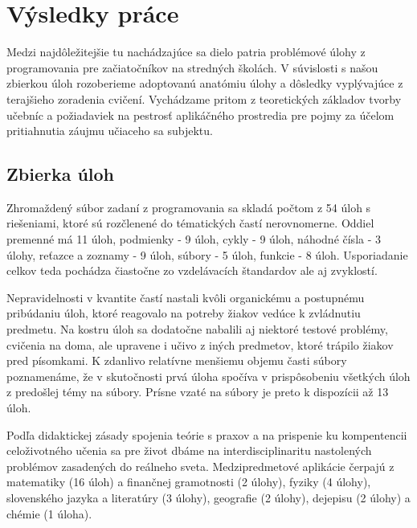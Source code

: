 \chapter{Výsledky práce}
Medzi najdôležitejšie tu nachádzajúce sa dielo patria problémové úlohy z programovania pre začiatočníkov na stredných školách. V súvislosti s našou zbierkou úloh rozoberieme adoptovanú anatómiu úlohy a dôsledky vyplývajúce z terajšieho zoradenia cvičení. Vychádzame pritom z teoretických základov tvorby učebníc a požiadaviek na pestrosť aplikáčného prostredia pre pojmy za účelom pritiahnutia záujmu učiaceho sa subjektu.

\section{Zbierka úloh}
Zhromaždený súbor zadaní z programovania sa skladá počtom z 54 úloh s riešeniami, ktoré sú rozčlenené do tématických častí nerovnomerne. Oddiel premenné má 11 úloh, podmienky - 9 úloh, cykly - 9 úloh, náhodné čísla - 3 úlohy, reťazce a zoznamy - 9 úloh, súbory - 5 úloh, funkcie - 8 úloh. Usporiadanie celkov teda pochádza čiastočne zo vzdelávacích štandardov ale aj zvyklostí.

Nepravidelnosti v kvantite častí nastali kvôli organickému a postupnému pribúdaniu úloh, ktoré reagovalo na potreby žiakov vedúce k zvládnutiu predmetu. Na kostru úloh sa dodatočne nabalili aj niektoré testové problémy, cvičenia na doma, ale upravene i učivo z iných predmetov, ktoré trápilo žiakov pred písomkami. K zdanlivo relatívne menšiemu objemu časti súbory poznamenáme, že v skutočnosti prvá úloha spočíva v prispôsobeniu všetkých úloh z predošlej témy na súbory. Prísne vzaté na súbory je preto k dispozícii až 13 úloh.

Podľa didaktickej zásady spojenia teórie s praxov a na prispenie ku kompentencii celoživotného učenia sa pre život dbáme na interdisciplinaritu nastolených problémov zasadených do reálneho sveta. Medzipredmetové aplikácie čerpajú z matematiky (16 úloh) a finančnej gramotnosti (2 úlohy), fyziky (4 úlohy), slovenského jazyka a literatúry (3 úlohy), geografie (2 úlohy), dejepisu (2 úlohy) a chémie (1 úloha). 

